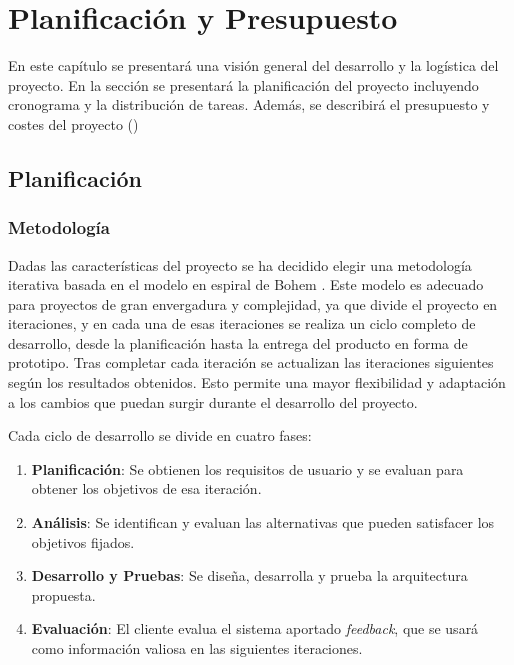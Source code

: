 \chapter{Planificación y Presupuesto}\label{chap:planificacion}
En este capítulo se presentará una visión general del desarrollo y la logística del proyecto. En la sección  se presentará la planificación del proyecto incluyendo cronograma y la distribución de tareas. Además, se describirá el presupuesto y costes del proyecto () 

\section{Planificación}\label{sec:planificacion}

\subsection{Metodología}\label{sec:metodologia}
Dadas las características del proyecto se ha decidido elegir una metodología iterativa basada en el modelo en espiral de Bohem \cite{ModeloEspiral}. Este modelo es adecuado para proyectos de gran envergadura y complejidad, ya que divide el proyecto en iteraciones, y en cada una de esas iteraciones se realiza un ciclo completo de desarrollo, desde la planificación hasta la entrega del producto en forma de prototipo. Tras completar cada iteración se actualizan las iteraciones siguientes según los resultados obtenidos. Esto permite una mayor flexibilidad y adaptación a los cambios que puedan surgir durante el desarrollo del proyecto.

Cada ciclo de desarrollo se divide en cuatro fases:

\begin{enumerate}
    \item \textbf{Planificación}: Se obtienen los requisitos de usuario y se evaluan para obtener los objetivos de esa iteración.
    \item \textbf{Análisis}: Se identifican y evaluan las alternativas que pueden satisfacer los objetivos fijados.
    \item \textbf{Desarrollo y Pruebas}: Se diseña, desarrolla y prueba la arquitectura propuesta.
    \item \textbf{Evaluación}: El cliente evalua el sistema aportado \textit{feedback}, que se usará como información valiosa en las siguientes iteraciones.
\end{enumerate}

